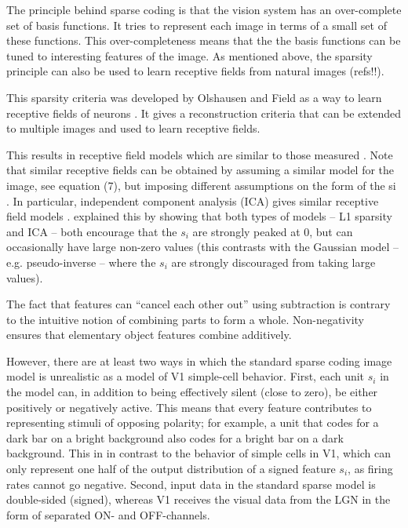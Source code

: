 The principle behind sparse coding is that the vision system has an over-complete set of basis functions.
It tries to represent each image in terms of a small set of these functions. This over-completeness means
that the the basis functions can be tuned to interesting features of the image. As mentioned above, the
sparsity principle can also be used to learn receptive fields from natural images (refs!!).

This sparsity criteria was developed by Olshausen and Field as a way to learn receptive fields of
neurons \citep{OlshausenField1996}. It gives a reconstruction criteria that can be extended to multiple images and used to learn receptive fields.

This results in receptive field models which are similar to those measured \citep{OlshausenField1996}. Note that similar
receptive fields can be obtained by assuming a similar model for the image, see equation (7), but imposing
different assumptions on the form of the si
. In particular, independent component analysis (ICA) gives
similar receptive field models \citep{vanHateren1998}.
\cite{Hyvarinen2010} explained this by showing that both types of models –
L1 sparsity and \ac{ICA} – both encourage that the $s_i$ are strongly peaked at 0, 
but can occasionally have
large non-zero values (this contrasts with the Gaussian model – e.g. pseudo-inverse – where the 
$s_i$ are strongly discouraged from taking large values).

The fact that features can ``cancel each other out'' using subtraction is contrary
to the intuitive notion of combining parts to form a whole.
Non-negativity ensures that elementary object features combine additively.

However, there are at least two ways in which the standard sparse coding image model
is unrealistic as a model of \ac{V1} simple-cell behavior.
First, each unit $s_i$ in the model can,
in addition to being effectively silent (close to zero),
be either positively or negatively active.
This means that every feature contributes to representing stimuli of opposing polarity;
for example, a unit that codes for a dark bar on a bright background also codes
for a bright bar on a dark background. This in in contrast to the behavior of simple cells
in \ac{V1}, which can only represent one half of the output distribution of a signed
feature $s_i$, as firing rates cannot go negative.
Second, input data in the standard sparse model is double-sided (signed),
whereas \ac{V1} receives the visual data from the \ac{LGN} in the form of separated
ON- and OFF-channels.


